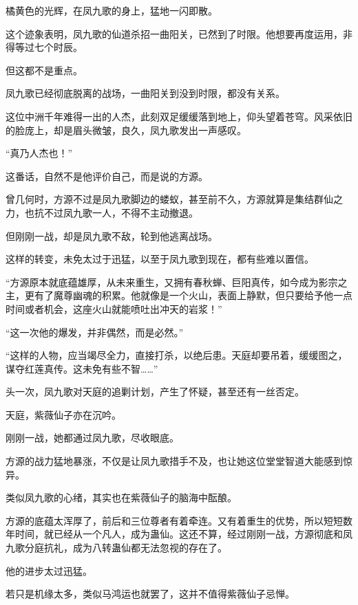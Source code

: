 
\begin{this_body}



橘黄色的光辉，在凤九歌的身上，猛地一闪即散。

这个迹象表明，凤九歌的仙道杀招一曲阳关，已然到了时限。他想要再度运用，非得等过七个时辰。

但这都不是重点。

凤九歌已经彻底脱离的战场，一曲阳关到没到时限，都没有关系。

这位中洲千年难得一出的人杰，此刻双足缓缓落到地上，仰头望着苍穹。风采依旧的脸庞上，却是眉头微皱，良久，凤九歌发出一声感叹。

“真乃人杰也！”

这番话，自然不是他评价自己，而是说的方源。

曾几何时，方源不过是凤九歌脚边的蝼蚁，甚至前不久，方源就算是集结群仙之力，也抗不过凤九歌一人，不得不主动撤退。

但刚刚一战，却是凤九歌不敌，轮到他逃离战场。

这样的转变，未免太过于迅猛，以至于凤九歌到现在，都有些难以置信。

“方源原本就底蕴雄厚，从未来重生，又拥有春秋蝉、巨阳真传，如今成为影宗之主，更有了魔尊幽魂的积累。他就像是一个火山，表面上静默，但只要给予他一点时间或者机会，这座火山就能喷吐出冲天的岩浆！”

“这一次他的爆发，并非偶然，而是必然。”

“这样的人物，应当竭尽全力，直接打杀，以绝后患。天庭却要吊着，缓缓图之，谋夺红莲真传。这未免有些不智……”

头一次，凤九歌对天庭的追剿计划，产生了怀疑，甚至还有一丝否定。

天庭，紫薇仙子亦在沉吟。

刚刚一战，她都通过凤九歌，尽收眼底。

方源的战力猛地暴涨，不仅是让凤九歌措手不及，也让她这位堂堂智道大能感到惊异。

类似凤九歌的心绪，其实也在紫薇仙子的脑海中酝酿。

方源的底蕴太浑厚了，前后和三位尊者有着牵连。又有着重生的优势，所以短短数年时间，就已经从一个凡人，成为蛊仙。这还不算，经过刚刚一战，方源彻底和凤九歌分庭抗礼，成为八转蛊仙都无法忽视的存在了。

他的进步太过迅猛。

若只是机缘太多，类似马鸿运也就罢了，这并不值得紫薇仙子忌惮。


\end{this_body}
